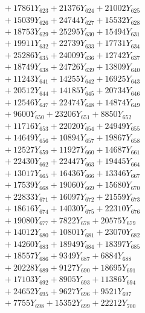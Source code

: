 \documentclass[a4paper,10pt]{article}
\begin{document}
{\begin{align}
&\;  + 17861 Y_{623} + 21376 Y_{624} + 21002 Y_{625} \\[0.3ex]
&\;  + 15039 Y_{626} + 24744 Y_{627} + 15532 Y_{628} \\[0.5ex]\allowbreak
&\;  + 18753 Y_{629} + 25295 Y_{630} + 15494 Y_{631} \\[0.3ex]
&\;  + 19911 Y_{632} + 22739 Y_{633} + 17731 Y_{634} \\[0.3ex]
&\;  + 25286 Y_{635} + 24009 Y_{636} + 12742 Y_{637} \\[0.3ex]
&\;  + 18749 Y_{638} + 24726 Y_{639} + 13809 Y_{640} \\[0.3ex]
&\;  + 11243 Y_{641} + 14255 Y_{642} + 16925 Y_{643} \\[0.3ex]
&\;  + 20512 Y_{644} + 14185 Y_{645} + 20734 Y_{646} \\[0.3ex]
&\;  + 12546 Y_{647} + 22474 Y_{648} + 14874 Y_{649} \\[0.3ex]
&\;  + 9600 Y_{650} + 23206 Y_{651} + 8850 Y_{652} \\[0.3ex]
&\;  + 11716 Y_{653} + 22020 Y_{654} + 24949 Y_{655} \\[0.3ex]
&\;  + 14649 Y_{656} + 10894 Y_{657} + 19867 Y_{658} \\[0.5ex]\allowbreak
&\;  + 12527 Y_{659} + 11927 Y_{660} + 14687 Y_{661} \\[0.3ex]
&\;  + 22430 Y_{662} + 22447 Y_{663} + 19445 Y_{664} \\[0.3ex]
&\;  + 13017 Y_{665} + 16436 Y_{666} + 13346 Y_{667} \\[0.3ex]
&\;  + 17539 Y_{668} + 19060 Y_{669} + 15680 Y_{670} \\[0.3ex]
&\;  + 22833 Y_{671} + 16097 Y_{672} + 21559 Y_{673} \\[0.3ex]
&\;  + 18616 Y_{674} + 14030 Y_{675} + 22310 Y_{676} \\[0.3ex]
&\;  + 19080 Y_{677} + 7822 Y_{678} + 20575 Y_{679} \\[0.3ex]
&\;  + 14012 Y_{680} + 10801 Y_{681} + 23070 Y_{682} \\[0.3ex]
&\;  + 14260 Y_{683} + 18949 Y_{684} + 18397 Y_{685} \\[0.3ex]
&\;  + 18557 Y_{686} + 9349 Y_{687} + 6884 Y_{688} \\[0.5ex]\allowbreak
&\;  + 20228 Y_{689} + 9127 Y_{690} + 18695 Y_{691} \\[0.3ex]
&\;  + 17103 Y_{692} + 8905 Y_{693} + 11386 Y_{694} \\[0.3ex]
&\;  + 24652 Y_{695} + 9627 Y_{696} + 9521 Y_{697} \\[0.3ex]
&\;  + 7755 Y_{698} + 15352 Y_{699} + 22212 Y_{700} \\[0.3ex]

\end{align}}
\end{document}
